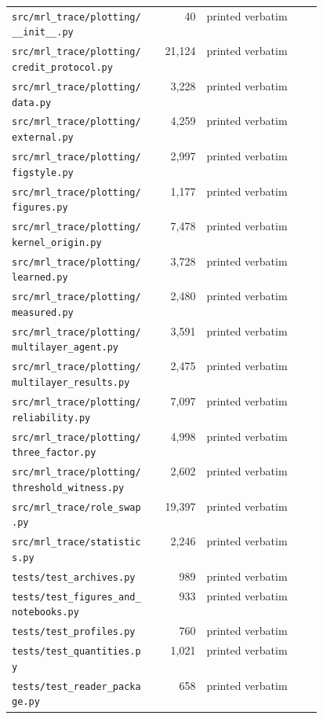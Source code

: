 \documentclass[a4paper,10pt]{article}
\begin{document}
\begin{longtable}{@{}p{0.46\linewidth} r l@{}}
\texttt{\scriptsize src/mrl\_trace/plotting/\_\_init\_\_.py} & 40 & printed verbatim \\
\texttt{\scriptsize src/mrl\_trace/plotting/credit\_protocol.py} & 21,124 & printed verbatim \\
\texttt{\scriptsize src/mrl\_trace/plotting/data.py} & 3,228 & printed verbatim \\
\texttt{\scriptsize src/mrl\_trace/plotting/external.py} & 4,259 & printed verbatim \\
\texttt{\scriptsize src/mrl\_trace/plotting/figstyle.py} & 2,997 & printed verbatim \\
\texttt{\scriptsize src/mrl\_trace/plotting/figures.py} & 1,177 & printed verbatim \\
\texttt{\scriptsize src/mrl\_trace/plotting/kernel\_origin.py} & 7,478 & printed verbatim \\
\texttt{\scriptsize src/mrl\_trace/plotting/learned.py} & 3,728 & printed verbatim \\
\texttt{\scriptsize src/mrl\_trace/plotting/measured.py} & 2,480 & printed verbatim \\
\texttt{\scriptsize src/mrl\_trace/plotting/multilayer\_agent.py} & 3,591 & printed verbatim \\
\texttt{\scriptsize src/mrl\_trace/plotting/multilayer\_results.py} & 2,475 & printed verbatim \\
\texttt{\scriptsize src/mrl\_trace/plotting/reliability.py} & 7,097 & printed verbatim \\
\texttt{\scriptsize src/mrl\_trace/plotting/three\_factor.py} & 4,998 & printed verbatim \\
\texttt{\scriptsize src/mrl\_trace/plotting/threshold\_witness.py} & 2,602 & printed verbatim \\
\texttt{\scriptsize src/mrl\_trace/role\_swap.py} & 19,397 & printed verbatim \\
\texttt{\scriptsize src/mrl\_trace/statistics.py} & 2,246 & printed verbatim \\
\texttt{\scriptsize tests/test\_archives.py} & 989 & printed verbatim \\
\texttt{\scriptsize tests/test\_figures\_and\_notebooks.py} & 933 & printed verbatim \\
\texttt{\scriptsize tests/test\_profiles.py} & 760 & printed verbatim \\
\texttt{\scriptsize tests/test\_quantities.py} & 1,021 & printed verbatim \\
\texttt{\scriptsize tests/test\_reader\_package.py} & 658 & printed verbatim \\

\end{longtable}
\end{document}
